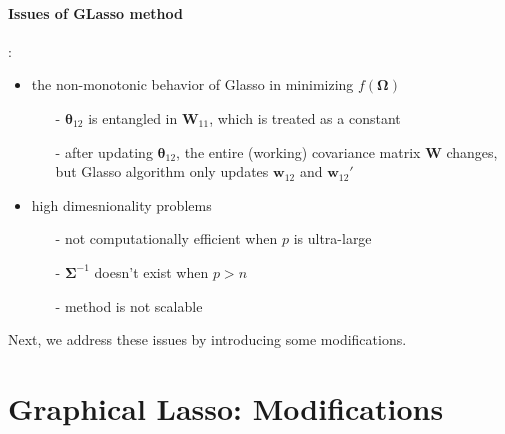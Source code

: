\documentclass[twoside]{article}
\begin{document}
\paragraph*{Issues of GLasso method}:
\begin{itemize}
    \item the non-monotonic behavior of Glasso in minimizing $f(\boldsymbol{\Omega})$
    \begin{itemize}
        \item[-] $\boldsymbol{\theta}_{12}$ is entangled in $\mathbf{W}_{11}$, which is  treated as a constant
        \item[-] after updating $\boldsymbol{\theta}_{12}$, the entire (working) covariance matrix $\mathbf{W}$ changes, but Glasso algorithm only updates $\mathbf{w}_{12}$ and $\mathbf{w}_{12}'$
    \end{itemize}
    \item high dimesnionality problems
    \begin{itemize}
        \item[-] not computationally efficient when $p$ is ultra-large
        \item[-] $\boldsymbol{\Sigma}^{-1}$ doesn't exist when $p>n$
        \item[-] method is not scalable 
    \end{itemize}
\end{itemize}
Next, we address these issues by introducing some modifications. 

\section{Graphical Lasso: Modifications}
\end{document}
